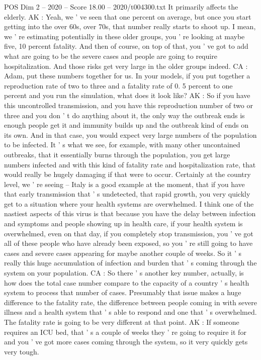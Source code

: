 \begin{textsample}{POS Dim 2 – 2020 – Score 18.00 – 2020/t004300.txt}
It primarily affects the elderly.
AK : Yeah, we ' ve seen that one percent on average, but once you start getting into the over 60s, over 70s, that number really starts to shoot up.
I mean, we ' re estimating potentially in these older groups, you ' re looking at maybe five, 10 percent fatality.
And then of course, on top of that, you ' ve got to add what are going to be the severe cases and people are going to require hospitalization.
And those risks get very large in the older groups indeed.
CA : Adam, put these numbers together for us.
In your models, if you put together a reproduction rate of two to three and a fatality rate of 0. 5 percent to one percent and you run the simulation, what does it look like?
AK : So if you have this uncontrolled transmission, and you have this reproduction number of two or three and you don ' t do anything about it, the only way the outbreak ends is enough people get it and immunity builds up and the outbreak kind of ends on its own.
And in that case, you would expect very large numbers of the population to be infected.
It ' s what we see, for example, with many other uncontained outbreaks, that it essentially burns through the population, you get large numbers infected and with this kind of fatality rate and hospitalization rate, that would really be hugely damaging if that were to occur.
Certainly at the country level, we ' re seeing -- Italy is a good example at the moment, that if you have that early transmission that ' s undetected, that rapid growth, you very quickly get to a situation where your health systems are overwhelmed.
I think one of the nastiest aspects of this virus is that because you have the delay between infection and symptoms and people showing up in health care, if your health system is overwhelmed, even on that day, if you completely stop transmission, you ' ve got all of these people who have already been exposed, so you ' re still going to have cases and severe cases appearing for maybe another couple of weeks.
So it ' s really this huge accumulation of infection and burden that ' s coming through the system on your population.
CA : So there ' s another key number, actually, is how does the total case number compare to the capacity of a country ' s health system to process that number of cases.
Presumably that issue makes a huge difference to the fatality rate, the difference between people coming in with severe illness and a health system that ' s able to respond and one that ' s overwhelmed.
The fatality rate is going to be very different at that point.
AK : If someone requires an ICU bed, that ' s a couple of weeks they ' re going to require it for and you ' ve got more cases coming through the system, so it very quickly gets very tough.

\end{textsample}
